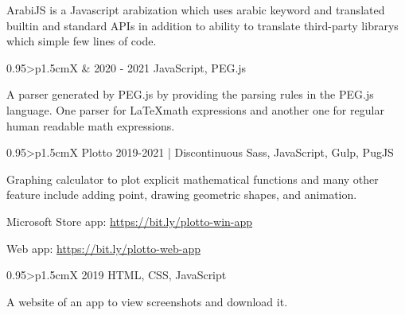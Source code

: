 \documentclass[a4paper, oneside, final]{scrartcl}
\begin{document}
\begin{center}
\begin{paracol}{2}
\vspace{2mm}
\parbox{0.95\linewidth}{%
ArabiJS is a Javascript arabization which uses arabic keyword and translated builtin and standard APIs in addition to ability to translate third-party librarys which simple few lines of code.
}%

\vspace{20pt}

\begin{tabularx}{0.95\linewidth}{>{\raggedleft\scshape}p{1.5cm}X}
 { \& }
 {2020 - 2021}
 {JavaScript, PEG.js}
\end{tabularx}

\vspace{2mm}
\parbox{0.95\linewidth}{%
A parser generated by PEG.js by providing the parsing rules in the PEG.js language. One parser for \LaTeX math expressions and another one for regular human readable math expressions.
}%

\vspace{20pt}

\begin{tabularx}{0.95\linewidth}{>{\raggedleft\scshape}p{1.5cm}X}
 {Plotto}
 {2019-2021 \scriptsize{| Discontinuous}}
 {Sass, JavaScript, Gulp, PugJS}
\end{tabularx}

\vspace{2mm}
\parbox{0.95\linewidth}{%
Graphing calculator to plot explicit mathematical functions and many other feature include adding point, drawing geometric shapes, and animation.
}%
\begin{items}
\item Microsoft Store app: \url{https://bit.ly/plotto-win-app}
\item Web app: \url{https://bit.ly/plotto-web-app}
\end{items}

\vspace{20pt}

\begin{tabularx}{0.95\linewidth}{>{\raggedleft\scshape}p{1.5cm}X}
 {}
 {2019}
 {HTML, CSS, JavaScript}
\end{tabularx}

\vspace{2mm}
\parbox{0.95\linewidth}{
A website of an app to view screenshots and download it.
}


\end{paracol}


\end{center}
\end{document}
